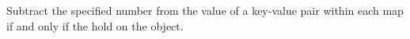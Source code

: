 Subtract the specified number from the value of a key-value pair within each
map if and only if the  hold on the object.



